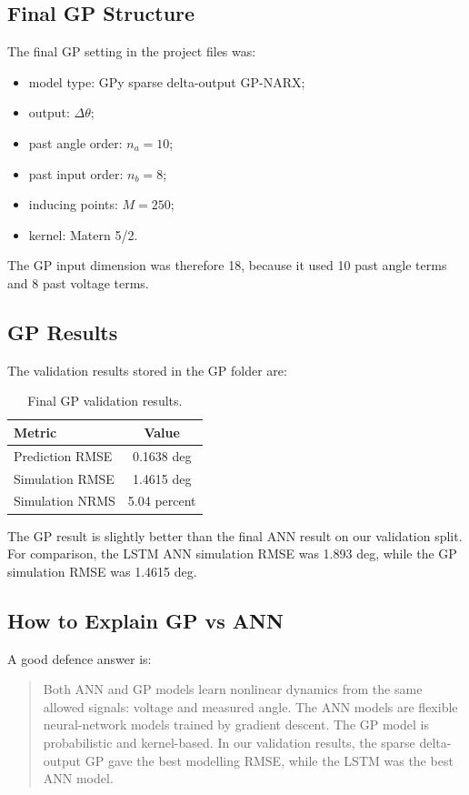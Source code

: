 \documentclass[11pt,a4paper]{article}
\begin{document}
\subsection{Final GP Structure}

The final GP setting in the project files was:

\begin{itemize}
    \item model type: GPy sparse delta-output GP-NARX;
    \item output: $\Delta \theta$;
    \item past angle order: $n_a = 10$;
    \item past input order: $n_b = 8$;
    \item inducing points: $M = 250$;
    \item kernel: Matern 5/2.
\end{itemize}

The GP input dimension was therefore 18, because it used 10 past angle terms and 8 past voltage terms.

\subsection{GP Results}

The validation results stored in the GP folder are:

\begin{table}[h]
\centering
\caption{Final GP validation results.}
\begin{tabular}{lc}
\toprule
Metric & Value \\
\midrule
Prediction RMSE & 0.1638 deg \\
Simulation RMSE & 1.4615 deg \\
Simulation NRMS & 5.04 percent \\
\bottomrule
\end{tabular}
\end{table}

The GP result is slightly better than the final ANN result on our validation split.
For comparison, the LSTM ANN simulation RMSE was 1.893 deg, while the GP simulation RMSE was 1.4615 deg.

\subsection{How to Explain GP vs ANN}

A good defence answer is:

\begin{quote}
Both ANN and GP models learn nonlinear dynamics from the same allowed signals: voltage and measured angle.
The ANN models are flexible neural-network models trained by gradient descent.
The GP model is probabilistic and kernel-based.
In our validation results, the sparse delta-output GP gave the best modelling RMSE, while the LSTM was the best ANN model.
\end{quote}
\end{document}
